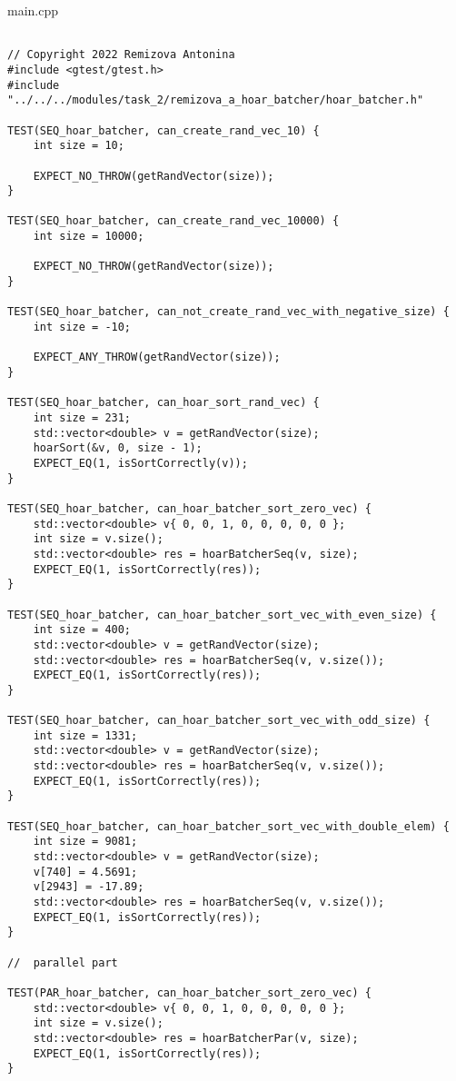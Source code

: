 \documentclass{report}
\begin{document}
\par main.cpp
\begin{lstlisting}

// Copyright 2022 Remizova Antonina
#include <gtest/gtest.h>
#include "../../../modules/task_2/remizova_a_hoar_batcher/hoar_batcher.h"

TEST(SEQ_hoar_batcher, can_create_rand_vec_10) {
    int size = 10;

    EXPECT_NO_THROW(getRandVector(size));
}

TEST(SEQ_hoar_batcher, can_create_rand_vec_10000) {
    int size = 10000;

    EXPECT_NO_THROW(getRandVector(size));
}

TEST(SEQ_hoar_batcher, can_not_create_rand_vec_with_negative_size) {
    int size = -10;

    EXPECT_ANY_THROW(getRandVector(size));
}

TEST(SEQ_hoar_batcher, can_hoar_sort_rand_vec) {
    int size = 231;
    std::vector<double> v = getRandVector(size);
    hoarSort(&v, 0, size - 1);
    EXPECT_EQ(1, isSortCorrectly(v));
}

TEST(SEQ_hoar_batcher, can_hoar_batcher_sort_zero_vec) {
    std::vector<double> v{ 0, 0, 1, 0, 0, 0, 0, 0 };
    int size = v.size();
    std::vector<double> res = hoarBatcherSeq(v, size);
    EXPECT_EQ(1, isSortCorrectly(res));
}

TEST(SEQ_hoar_batcher, can_hoar_batcher_sort_vec_with_even_size) {
    int size = 400;
    std::vector<double> v = getRandVector(size);
    std::vector<double> res = hoarBatcherSeq(v, v.size());
    EXPECT_EQ(1, isSortCorrectly(res));
}

TEST(SEQ_hoar_batcher, can_hoar_batcher_sort_vec_with_odd_size) {
    int size = 1331;
    std::vector<double> v = getRandVector(size);
    std::vector<double> res = hoarBatcherSeq(v, v.size());
    EXPECT_EQ(1, isSortCorrectly(res));
}

TEST(SEQ_hoar_batcher, can_hoar_batcher_sort_vec_with_double_elem) {
    int size = 9081;
    std::vector<double> v = getRandVector(size);
    v[740] = 4.5691;
    v[2943] = -17.89;
    std::vector<double> res = hoarBatcherSeq(v, v.size());
    EXPECT_EQ(1, isSortCorrectly(res));
}

//  parallel part

TEST(PAR_hoar_batcher, can_hoar_batcher_sort_zero_vec) {
    std::vector<double> v{ 0, 0, 1, 0, 0, 0, 0, 0 };
    int size = v.size();
    std::vector<double> res = hoarBatcherPar(v, size);
    EXPECT_EQ(1, isSortCorrectly(res));
}


\end{lstlisting}
\end{document}
